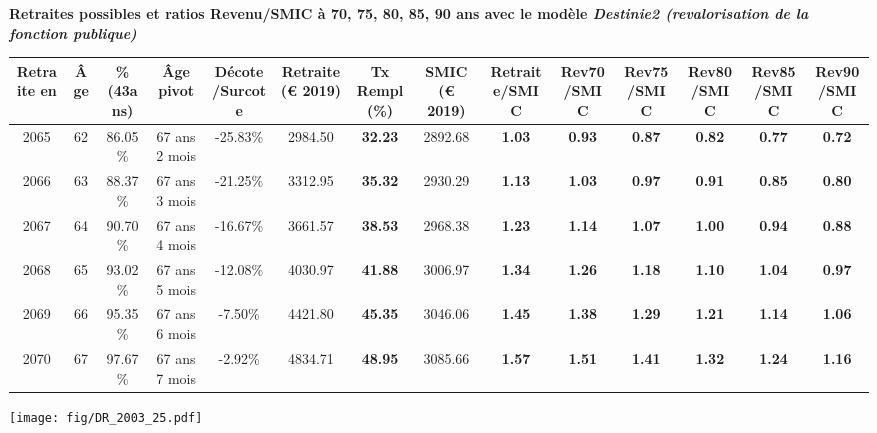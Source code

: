  \vspace{0.1cm} 
{\bf \noindent Retraites possibles et ratios Revenu/SMIC à 70, 75, 80, 85, 90 ans avec le modèle \emph{Destinie2 (revalorisation de la fonction publique)}}  
 
\begin{adjustbox}{max width=\textwidth} 
\begin{tabular}[htb]{|c|c||c|c|c||c|c||c||c|c|c|c|c|c|} 
\hline 
 Retraite en &  Âge &  \%(43ans) &  Âge pivot &  Décote/Surcote &  Retraite (\euro{} 2019) &  Tx Rempl(\%) &  SMIC (\euro{} 2019) &  Retraite/SMIC &  Rev70/SMIC &  Rev75/SMIC &  Rev80/SMIC &  Rev85/SMIC &  Rev90/SMIC \\ 
\hline \hline 
 2065 &  62 &  86.05\% &  67 ans 2 mois &  -25.83\% &  2984.50 &  {\bf 32.23} &  2892.68 &  {\bf 1.03} &  {\bf {\color{red} 0.93}} &  {\bf {\color{red} 0.87}} &  {\bf {\color{red} 0.82}} &  {\bf {\color{red} 0.77}} &  {\bf {\color{red} 0.72}} \\ 
\hline 
 2066 &  63 &  88.37\% &  67 ans 3 mois &  -21.25\% &  3312.95 &  {\bf 35.32} &  2930.29 &  {\bf 1.13} &  {\bf 1.03} &  {\bf {\color{red} 0.97}} &  {\bf {\color{red} 0.91}} &  {\bf {\color{red} 0.85}} &  {\bf {\color{red} 0.80}} \\ 
\hline 
 2067 &  64 &  90.70\% &  67 ans 4 mois &  -16.67\% &  3661.57 &  {\bf 38.53} &  2968.38 &  {\bf 1.23} &  {\bf 1.14} &  {\bf 1.07} &  {\bf 1.00} &  {\bf {\color{red} 0.94}} &  {\bf {\color{red} 0.88}} \\ 
\hline 
 2068 &  65 &  93.02\% &  67 ans 5 mois &  -12.08\% &  4030.97 &  {\bf 41.88} &  3006.97 &  {\bf 1.34} &  {\bf 1.26} &  {\bf 1.18} &  {\bf 1.10} &  {\bf 1.04} &  {\bf {\color{red} 0.97}} \\ 
\hline 
 2069 &  66 &  95.35\% &  67 ans 6 mois &  -7.50\% &  4421.80 &  {\bf 45.35} &  3046.06 &  {\bf 1.45} &  {\bf 1.38} &  {\bf 1.29} &  {\bf 1.21} &  {\bf 1.14} &  {\bf 1.06} \\ 
\hline 
 2070 &  67 &  97.67\% &  67 ans 7 mois &  -2.92\% &  4834.71 &  {\bf 48.95} &  3085.66 &  {\bf 1.57} &  {\bf 1.51} &  {\bf 1.41} &  {\bf 1.32} &  {\bf 1.24} &  {\bf 1.16} \\ 
\hline 
\hline 
\end{tabular} 
\end{adjustbox} 
 
 \vspace{0.1cm} 

 \begin{center}\texttt{[image: fig/DR\_2003\_25.pdf]}\end{center} \label{fig/DR_2003_25.pdf} 

